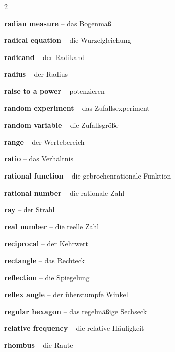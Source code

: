 \begin{multicols}{2}
\par\nopagebreak
\textbf{radian measure} -- das Bogenmaß\dotfill\hyperref[e:139]{\pageref*{e:139}}\par
\textbf{radical equation} -- die Wurzelgleichung\dotfill\hyperref[e:83]{\pageref*{e:83}}\par
\textbf{radicand} -- der Radikand\dotfill\hyperref[e:48]{\pageref*{e:48}}\par
\textbf{radius} -- der Radius\dotfill\hyperref[e:213]{\pageref*{e:213}}\par
\textbf{raise to a power} -- potenzieren\dotfill\hyperref[e:50]{\pageref*{e:50}}\par
\textbf{random experiment} -- das Zufallsexperiment\dotfill\hyperref[e:326]{\pageref*{e:326}}\par
\textbf{random variable} -- die Zufallsgröße\dotfill\hyperref[e:334]{\pageref*{e:334}}\par
\textbf{range} -- der Wertebereich\dotfill\hyperref[e:110]{\pageref*{e:110}}\par
\textbf{ratio} -- das Verhältnis\dotfill\hyperref[e:40]{\pageref*{e:40}}\par
\textbf{rational function} -- die gebrochenrationale Funktion\dotfill\hyperref[e:127]{\pageref*{e:127}}\par
\textbf{rational number} -- die rationale Zahl\dotfill\hyperref[e:7]{\pageref*{e:7}}\par
\textbf{ray} -- der Strahl\dotfill\hyperref[e:149]{\pageref*{e:149}}\par
\textbf{real number} -- die reelle Zahl\dotfill\hyperref[e:8]{\pageref*{e:8}}\par
\textbf{reciprocal} -- der Kehrwert\dotfill\hyperref[e:39]{\pageref*{e:39}}\par
\textbf{rectangle} -- das Rechteck\dotfill\hyperref[e:199]{\pageref*{e:199}}\par
\textbf{reflection} -- die Spiegelung\dotfill\hyperref[e:172]{\pageref*{e:172}}\par
\textbf{reflex angle} -- der überstumpfe Winkel\dotfill\hyperref[e:161]{\pageref*{e:161}}\par
\textbf{regular hexagon} -- das regelmäßige Sechseck\dotfill\hyperref[e:205]{\pageref*{e:205}}\par
\textbf{relative frequency} -- die relative Häufigkeit\dotfill\hyperref[e:331]{\pageref*{e:331}}\par
\textbf{rhombus} -- die Raute\dotfill\hyperref[e:201]{\pageref*{e:201}}\par

\end{multicols}
